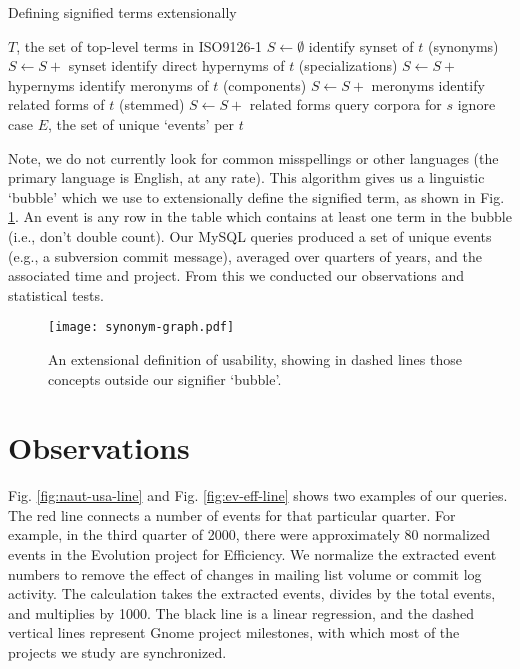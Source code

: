 \documentclass[conference, compsoc]{IEEEtran}
\begin{document}
\renewcommand{\algorithmiccomment}[1]{// #1}
\begin{algorithm}[H]
\caption{Defining signified terms extensionally}
  \label{alg1}
\begin{algorithmic}
	\REQUIRE $T$, the set of top-level terms in ISO9126-1
	\STATE $S \leftarrow \emptyset $
	\STATE identify synset of $t$ (synonyms)%
	\STATE $S \leftarrow S +$ synset
	\STATE identify direct hypernyms of $t$ (specializations)%
	\STATE $S \leftarrow S +$ hypernyms %
	\STATE identify meronyms of $t$ (components)%
	\STATE $S \leftarrow S +$ meronyms %
	\STATE identify related forms of $t$ (stemmed)%
	\STATE $S \leftarrow S +$ related forms
		\STATE query corpora for $s$
		\COMMENT ignore case
	\ENDFOR
  \ENDFOR
\RETURN $E$, the set of unique `events' per $t$

\end{algorithmic}
\end{algorithm}
Note, we do not currently look for common misspellings or other languages (the primary language is English, at any rate). This algorithm gives us a linguistic `bubble' which we use to extensionally define the signified term, as shown in Fig. \ref{fig:syngraph}. An event is any row in the table which contains at least one term in the bubble (i.e., don't double count). Our MySQL queries produced a set of unique events (e.g., a subversion commit message), averaged over quarters of years, and the associated time and project. From this we conducted our observations and statistical tests.

\begin{figure}[b]
\centering
\texttt{[image: synonym-graph.pdf]}
\caption{An extensional definition of usability, showing in dashed lines those concepts outside our signifier `bubble'.}
\label{fig:syngraph}
\end{figure}

\section{Observations}
\label{sec:observations}
Fig. \ref{fig:naut-usa-line} and Fig. \ref{fig:ev-eff-line} shows two examples of our queries. The red line connects a number of events for that particular quarter. For example, in the third quarter of 2000, there were approximately 80 normalized events in the Evolution project for Efficiency. We normalize the extracted event numbers to remove the effect of changes in mailing list volume or commit log activity. The calculation takes the extracted events, divides by the total events, and multiplies by 1000. The black line is a linear regression, and the dashed vertical lines represent Gnome project milestones, with which most of the projects we study are synchronized.
\end{document}
